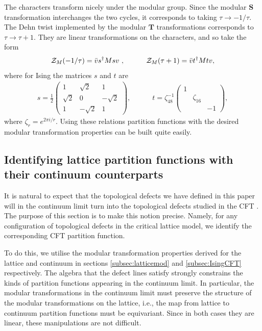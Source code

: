 \documentclass[11pt]{article}
\newcommand{\modT}{{\mathbf{T}}}
\newcommand{\modS}{{\mathbf{S}}}
\numberwithin{equation}{section}		%
\begin{document}
The characters transform nicely under the modular group. Since the modular $\modS$ transformation interchanges the two cycles, it corresponds to taking $\tau \rightarrow -1/\tau$. The Dehn twist implemented by the modular $\modT$ transformations corresponds to $\tau \rightarrow \tau +1$. They are linear transformations on the characters, and so take the form \cite{Cardy1986}
\begin{align}
{\cal Z}_{M}(-1/\tau) = \bar{v} s^{\dagger} M s v\ , \qquad\quad {\cal Z}_{M}(\tau+1)= \bar{v}t^{\dagger} M t v, 
\end{align}
where for Ising the matrices $s$ and $t$ are
\begin{align}
	s = \frac{1}{2} \begin{pmatrix}1&\sqrt{2}&1\\ \sqrt{2}&0&-\sqrt{2}\\1&-\sqrt{2}&1 \end{pmatrix},\qquad\quad
	t = \zeta_{48}^{-1} \begin{pmatrix}1&&\\ &\zeta_{16}&\\&& -1\end{pmatrix}, 
\label{stcft}	
\end{align}
where $\zeta_r = e^{2\pi i/r}$.
Using these relations partition functions with the desired modular transformation properties can be built quite easily. 


\subsection{Identifying lattice partition functions with their continuum counterparts}



It is natural to expect that the topological defects we have defined in this paper will in the continuum limit turn into the topological defects studied in the CFT \cite{Frohlich:2006}.  The purpose of this section is to make this notion precise. Namely, for any configuration of topological defects in the critical lattice model, we identify the corresponding CFT partition function. 


To do this, we utilise 
the modular transformation properties derived for the lattice and continuum in sections \ref{subsec:latticemod} and \ref{subsec:IsingCFT} respectively.
The algebra that the defect lines satisfy strongly constrains the kinds of partition functions appearing in the continuum limit. In particular, the modular transformations in the continuum limit must preserve the structure of the modular transformations on the lattice, i.e., the map from lattice to continuum partition functions must be equivariant. Since in both cases they are linear, these manipulations are not difficult.
\end{document}
